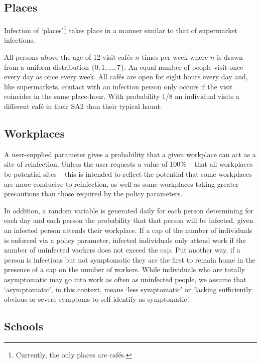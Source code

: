 \documentclass[submission]{grattan}
\begin{document}
\subsection{Places}

Infection of `places'\footnote{Currently, the only places are caf\'{e}s.}
takes place in a manner similar to that of supermarket infections.

All persons above the age of 12 visit caf\'es \(n\)
times per week where \(n\) is drawn from a
uniform distribution \(\{0, 1, \dots, 7\}\). An equal number of people
visit once every day as once every week. All caf\'es are open for eight
hours every day and, like supermarkets, contact with an infection person
only occurs if the visit coincides in the same place-hour. With probability
1/8 an individual visits a different caf\'e in their SA2 than their typical
haunt.

\subsection{Workplaces}

A user-supplied parameter gives a probability that a given workplace can act as a site
of reinfection. Unless the user requests a value of 100\% -- that all workplaces
be potential sites -- this is intended to reflect the potential that some workplaces are more
conducive to reinfection, as well as some workplaces taking greater precautions than those
required by the policy parameters.

In addition, a random variable is generated daily for each person determining for each day
and each person the probability that that person will be infected, given an infected person
attends their workplace. If a cap of the number of individuals is enforced via a policy
parameter, infected individuals only attend work if the number of uninfected workers does
not exceed the cap. Put another way, if a person is infectious but not symptomatic they are
the first to remain home in the presence of a cap on the number of workers. While individuals
who are totally asymptomatic may go into work as often as uninfected people, we assume that
`asymptomatic', in this context, means `less symptomatic' or `lacking sufficiently obvious
or severe symptoms to self-identify as symptomatic'.

\subsection{Schools}
\end{document}
